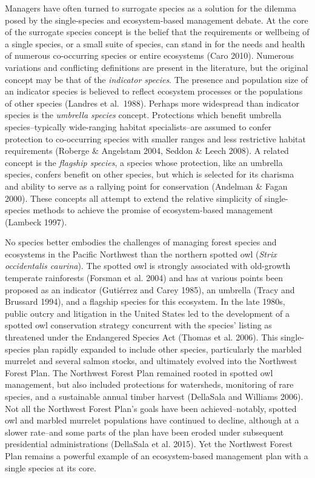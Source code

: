 \documentclass{sfuthesis}
\begin{document}
Managers have often turned to surrogate species as a solution for the dilemma posed by the single-species and ecosystem-based management debate. At the core of the surrogate species concept is the belief that the requirements or wellbeing of a single species, or a small suite of species, can stand in for the needs and health of numerous co-occurring species or entire ecosystems (Caro 2010). Numerous variations and conflicting definitions are present in the literature, but the original concept may be that of the \emph{indicator species}. The presence and population size of an indicator species is believed to reflect ecosystem processes or the populations of other species (Landres et al.~1988). Perhaps more widespread than indicator species is the \emph{umbrella species} concept. Protections which benefit umbrella species--typically wide-ranging habitat specialists--are assumed to confer protection to co-occurring species with smaller ranges and less restrictive habitat requirements (Roberge \& Angelstam 2004, Seddon \& Leech 2008). A related concept is the \emph{flagship species}, a species whose protection, like an umbrella species, confers benefit on other species, but which is selected for its charisma and ability to serve as a rallying point for conservation (Andelman \& Fagan 2000). These concepts all attempt to extend the relative simplicity of single-species methods to achieve the promise of ecosystem-based management (Lambeck 1997).

No species better embodies the challenges of managing forest species and ecosystems in the Pacific Northwest than the northern spotted owl (\emph{Strix occidentalis caurina}). The spotted owl is strongly associated with old-growth temperate rainforests (Forsman et al. 2004) and has at various points been proposed as an indicator (Gutiérrez and Carey 1985), an umbrella (Tracy and Brussard 1994), and a flagship species for this ecosystem. In the late 1980s, public outcry and litigation in the United States led to the development of a spotted owl conservation strategy concurrent with the species' listing as threatened under the Endangered Species Act (Thomas et al. 2006). This single-species plan rapidly expanded to include other species, particularly the marbled murrelet and several salmon stocks, and ultimately evolved into the Northwest Forest Plan. The Northwest Forest Plan remained rooted in spotted owl management, but also included protections for watersheds, monitoring of rare species, and a sustainable annual timber harvest (DellaSala and Williams 2006). Not all the Northwest Forest Plan's goals have been achieved--notably, spotted owl and marbled murrelet populations have continued to decline, although at a slower rate--and some parts of the plan have been eroded under subsequent presidential administrations (DellaSala et al. 2015). Yet the Northwest Forest Plan remains a powerful example of an ecosystem-based management plan with a single species at its core.
\end{document}
